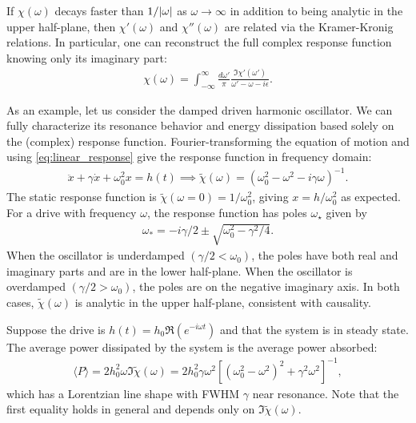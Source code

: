 \documentclass[reprint,
nofootinbib,
amsmath,amssymb,
aps]{revtex4-1}
\newcommand{\f}[2]{\frac{#1}{#2}}
\begin{document}
If $\chi(\omega)$ decays faster than $1/\abs{\omega}$ as $\omega \to \infty$ in addition to being analytic in the upper half-plane, then $\chi'(\omega)$ and $\chi''(\omega)$ are related via the Kramer-Kronig relations. In particular, one can reconstruct the full complex response function knowing only its imaginary part:
\begin{align*}
\chi(\omega) = \int_{-\infty}^\infty \f{d\omega'}{\pi} \f{\Im \chi'(\omega')}{\omega' - \omega - i\epsilon}.
\end{align*}

As an example, let us consider the damped driven harmonic oscillator. We can fully characterize its resonance behavior and energy dissipation based solely on the (complex) response function. Fourier-transforming the equation of motion and using  \eqref{eq:linear_response} give the response function in frequency domain:
\begin{align*}
\ddot{x} + \gamma \dot{x} + \omega_0^2 x = h(t) \implies 
\tilde{\chi}(\omega) = ( \omega_0^2 - \omega^2 - i \gamma \omega)^{-1}.
\end{align*}
The static response function is $\tilde{\chi}(\omega = 0) = 1/\omega_0^2$, giving $x = h/\omega_0^2$ as expected. For a drive with frequency $\omega$, the response function has poles $\omega_\star$ given by 
\begin{align*}
\omega_* = -i\gamma/2 \pm \sqrt{\omega_0^2  - \gamma^2/4}.
\end{align*}
When the oscillator is underdamped $(\gamma/2 < \omega_0)$, the poles have both real and imaginary parts and are in the lower half-plane. When the oscillator is overdamped $(\gamma/2 > \omega_0)$, the poles are on the negative imaginary axis. In both cases, $\tilde{\chi}(\omega)$ is analytic in the upper half-plane, consistent with causality. 

Suppose the drive is $h(t) = h_0 \Re(e^{-i\omega t})$ and that the system is in steady state. The average power dissipated by the system is the average power absorbed: 
\begin{align*}
\langle P \rangle = 2h_0^2 \omega \Im\widetilde{\chi}(\omega) = 2h_0^2  \gamma \omega^2 [(\omega_0^2 - \omega^2)^2 + \gamma^2 \omega^2]^{-1},
\end{align*}
which has a Lorentzian line shape with FWHM $\gamma$ near resonance. Note that the first equality holds in general and depends only on $\Im \widetilde{\chi}(\omega)$.
%
\end{document}
